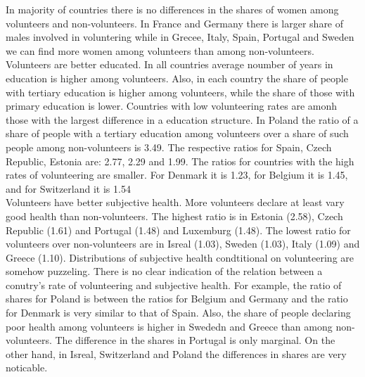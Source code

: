 \documentclass[10pt, letterpaper]{article}
\begin{document}
\begin{spacing}{1.4}
In majority of countries there is no differences in the shares of women among volunteers and non-volunteers. In France and Germany there is larger share of males involved in voluntering while in Grecee, Italy, Spain, Portugal and Sweden we can find more women among volunteers than among non-volunteers. \\

Volunteers are better educated. In all countries average noumber of years in education is higher among volunteers. Also, in each country the share of people with tertiary education is higher among volunteers, while the share of those with primary education is lower. Countries with low volunteering rates are amonh those with the largest difference in a education structure. In Poland the ratio of a share of people with a tertiary  education among volunteers over a share of such people among non-volunteers is 3.49. The respective ratios for Spain, Czech Republic, Estonia are: 2.77, 2.29 and 1.99. The ratios for countries with the high rates of volunteering are smaller. For Denmark it is 1.23, for Belgium it is 1.45, and for Switzerland it is 1.54 \\

Volunteers have better subjective health.  More volunteers declare at least vary good health than non-volunteers. The highest ratio is in Estonia (2.58), Czech Republic (1.61) and Portugal (1.48) and Luxemburg (1.48). The lowest ratio for volunteers over non-volunteers are in Isreal (1.03), Sweden (1.03), Italy (1.09) and Greece (1.10). Distributions of subjective health condtitional on volunteering are somehow puzzeling. There is no clear indication of the relation between a conutry's rate of volunteering and subjective health. For example, the ratio of shares for Poland is between the ratios for Belgium and  Germany and the ratio for Denmark is very similar to that of Spain. Also, the share of people declaring poor health among volunteers is higher in Swededn and Greece than among non-volunteers. The difference in the shares in Portugal is only marginal. On the other hand, in Isreal, Switzerland and Poland the differences in shares are very noticable. \\


\end{spacing}
\end{document}
